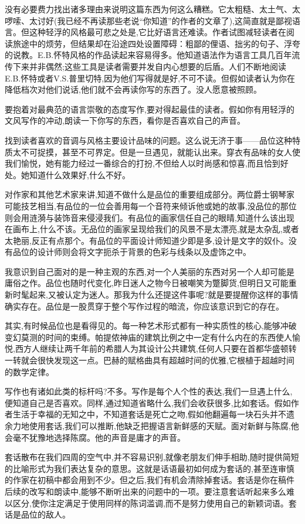 没有必要费力找出诸多理由来说明这篇东西为何这么糟糕。它太粗糙、太土气、太啰嗦、太讨好(我已经不再读那些老说“你知道”的作者的文章了),这简直就是鄙视语言。但这种轻浮的风格最可悲之处是,它比好语言还难读。作者试图减轻读者在阅读旅途中的烦劳，但结果却在沿途四处设置障碍：粗鄙的俚语、拙劣的句子、浮夸的说教。E.B.怀特风格的作品读起来容易得多。他知道语法作为语言工具几百年流传下来并非偶然;这些工具是读者需要并发自内心想要的后盾。人们不断地阅读E.B.怀特或者V.S.普里切特,因为他们写得就是好,不可不读。但假如读者认为你在降低档次对他们说话,他们就不会再读你写的东西了。没人愿意被照顾。

要抱着对最典范的语言崇敬的态度写作,要对得起最佳的读者。假如你有用轻浮的文风写作的冲动,朗读一下你写的东西，看你是否喜欢自己的声音。

找到读者喜欢的音调与风格主要设计品味的问题。这么说无济于事——品位这种特质太不可捉摸，甚至不可界定。但是一旦遇见，就能认出来。穿衣有品味的女人使我们愉悦，她有能力经过一番综合的打扮,不但给人以时尚感和惊喜,而且恰到好处。她知道什么效果好,什么不好。

对作家和其他艺术家来讲,知道不做什么是品位的重要组成部分。两位爵士钢琴家可能技艺相当,有品位的一位会善用每一个音符来倾诉他或她的故事,没品位的那位则会用涟漪与装饰音来侵浸我们。有品位的画家信任自己的眼晴,知道什么该出现在画布上,什么不该。无品位的画家呈现给我们的风景不是太漂亮,就是太杂乱,或者太艳丽,反正有点那个。有品位的平面设计师知道少即是多,设计是文字的奴仆。没有品位的设计师则会将文字扼杀于背景的色彩与线条以及虚饰之中。

我意识到自己面对的是一种主观的东西,对一个人美丽的东西对另一个人却可能是庸俗之作。品位也随时代变化,昨日迷人之物今日被嘲笑为蹩脚货,但明日又可能重新时髦起来,又被认定为迷人。那我为什么还提这件事呢?就是要提醒你这样的事情确实存在。品位是一股贯穿于整个写作过程的暗流，你应该意识到它的存在。

其实,有时候品位也是看得见的。每一种艺术形式都有一种实质性的核心,能够冲破变幻莫测的时间的束缚。帕提侬神庙的建筑比例之中一定有什么内在的东西使人愉悦,西方人继续让两千年前的希腊人为其设计公共建筑,任何人只要在首都华盛顿转一转就会很快发现这一点。巴赫的赋格曲具有超越时间的优雅,它根植于超越时间的数学定律。

写作也有诸如此类的标杆吗?不多。写作是每个人个性的表达,我们一旦遇上什么,便知道自己是否喜欢。同样,通过知道省略什么,我们会收获很多,比如套话。假如作者生活于幸福的无知之中，不知道套话是死亡之吻,假如他翻遍每一块石头并不遗余力地使用套话,我们可以推断,他缺乏把握语言新鲜感的天赋。面对新鲜与陈腐,他会毫不犹豫地选择陈腐。他的声音是庸才的声音。

套话散布在我们四周的空气中,并不容易识别,就像老朋友们伸手相助,随时提供简短的比喻形式为我们表达复杂的意思。这就是话语最初如何成为套话的,甚至连审慎的作家在初稿中都会用到不少。但之后,我们有机会清除掉套话。套话是你在稿件后续的改写和朗读中,能够不断听出来的问题中的一项。要注意套话听起来多么难以区分,使你注定满足于使用同样的陈词滥调,而不是努力使用自己的新颖词语。套话是品位的敌人。

